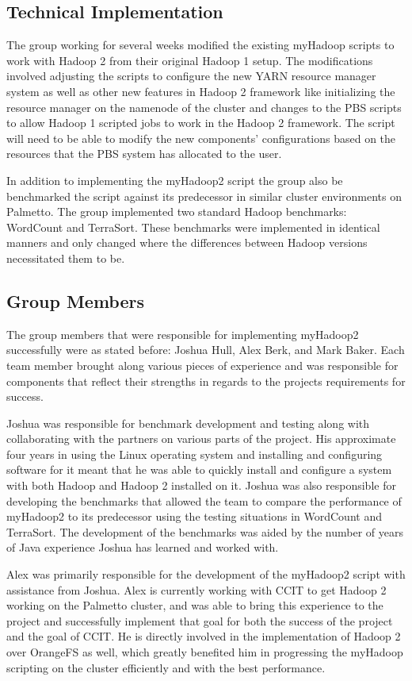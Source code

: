 \documentclass[conference]{IEEEtran}
\begin{document}
		\subsection{Technical Implementation}
			The group working for several weeks modified the existing myHadoop scripts to work with Hadoop 2 from their original Hadoop 1 setup. The modifications involved adjusting the scripts to configure the new YARN resource manager system as well as other new features in Hadoop 2 framework like initializing the resource manager on the namenode of the cluster and changes to the PBS scripts to allow Hadoop 1 scripted jobs to work in the Hadoop 2 framework.  The script will need to be able to modify the new components’ configurations based on the resources that the PBS system has allocated to the user.

			In addition to implementing the myHadoop2 script the group also be benchmarked the script against its predecessor in similar cluster environments on Palmetto. The group implemented two standard Hadoop benchmarks: WordCount and TerraSort. These benchmarks were implemented in identical manners and only changed where the differences between Hadoop versions necessitated them to be.
		\subsection{Group Members}
			The group members that were responsible for implementing myHadoop2 successfully were as stated before: Joshua Hull, Alex Berk, and Mark Baker. Each team member brought along various pieces of experience and was responsible for components that reflect their strengths in regards to the projects requirements for success. 

			Joshua was responsible for benchmark development and testing along with collaborating with the partners on various parts of the project. His approximate four years in using the Linux operating system and installing and configuring software for it meant that he was able to quickly install and configure a system with both Hadoop and Hadoop 2 installed on it. Joshua was also responsible for developing the benchmarks that allowed the team to compare the performance of myHadoop2 to its predecessor using the testing situations in WordCount and TerraSort. The development of the benchmarks was aided by the number of years of Java experience Joshua has learned and worked with.

			Alex was primarily responsible for the development of the myHadoop2 script with assistance from Joshua. Alex is currently working with CCIT to get Hadoop 2 working on the Palmetto cluster, and was able to bring this experience to the project and successfully implement that goal for both the success of the project and the goal of CCIT.  He is directly involved in the implementation of Hadoop 2 over OrangeFS as well, which greatly benefited him in progressing the myHadoop scripting on the cluster efficiently and with the best performance.
\end{document}
